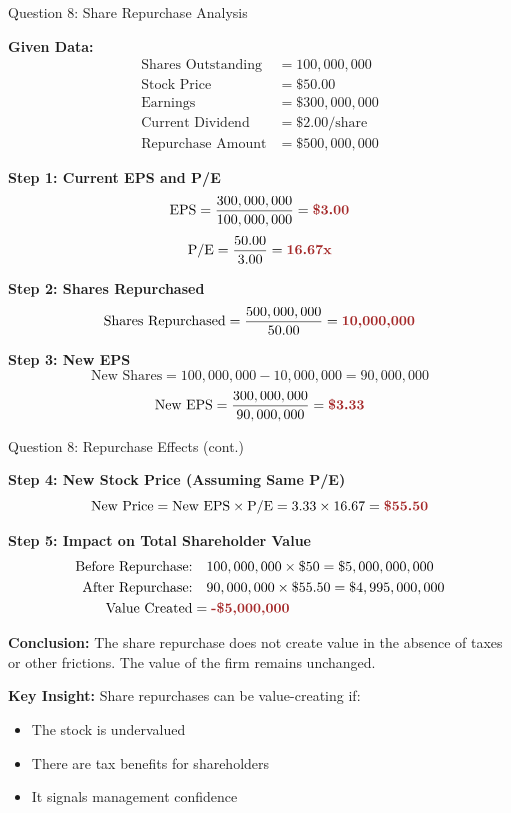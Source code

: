 \documentclass[aspectratio=169]{beamer}
\newcommand{\subquestion}[1]{{\bfseries\color{darkgreen}#1}}
\newcommand{\highlight}[1]{\textcolor{crimson}{\textbf{#1}}}
\begin{document}
	\begin{frame}{Question 8: Share Repurchase Analysis}
		
		\subquestion{Given Data:}
		\begin{align*}
			\text{Shares Outstanding} &= 100,000,000 \\
			\text{Stock Price} &= \$50.00 \\
			\text{Earnings} &= \$300,000,000 \\
			\text{Current Dividend} &= \$2.00/\text{share} \\
			\text{Repurchase Amount} &= \$500,000,000
		\end{align*}
		
		\textbf{Step 1: Current EPS and P/E}
		\[
		\text{EPS} = \frac{300,000,000}{100,000,000} = \highlight{\$3.00}
		\]
		\[
		\text{P/E} = \frac{50.00}{3.00} = \highlight{16.67\text{x}}
		\]
		
		\textbf{Step 2: Shares Repurchased}
		\[
		\text{Shares Repurchased} = \frac{500,000,000}{50.00} = \highlight{10,000,000}
		\]
		
		\textbf{Step 3: New EPS}
		\[
		\text{New Shares} = 100,000,000 - 10,000,000 = 90,000,000
		\]
		\[
		\text{New EPS} = \frac{300,000,000}{90,000,000} = \highlight{\$3.33}
		\]
	\end{frame}
	
	\begin{frame}{Question 8: Repurchase Effects (cont.)}
		
		\textbf{Step 4: New Stock Price (Assuming Same P/E)}
		\[
		\text{New Price} = \text{New EPS} \times \text{P/E} = 3.33 \times 16.67 = \highlight{\$55.50}
		\]
		
		\textbf{Step 5: Impact on Total Shareholder Value}
		\begin{align*}
			\text{Before Repurchase:} & \quad 100,000,000 \times \$50 = \$5,000,000,000 \\
			\text{After Repurchase:} & \quad 90,000,000 \times \$55.50 = \$4,995,000,000 \\
			\text{Value Created} &= \highlight{-\$5,000,000}
		\end{align*}
		
		\textbf{Conclusion:}
		The share repurchase does not create value in the absence of taxes or other frictions. The value of the firm remains unchanged.
		
		\textbf{Key Insight:}
		Share repurchases can be value-creating if:
		\begin{itemize}
			\item The stock is undervalued
			\item There are tax benefits for shareholders
			\item It signals management confidence
		\end{itemize}
	\end{frame}
	
\end{document}
